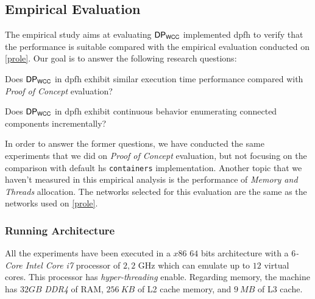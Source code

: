 \subsection{Empirical Evaluation}\label{sec:new:eval}
The empirical study aims at evaluating $\mathsf{DP_{WCC}}$ implemented \acrshort{dpfh} to verify that the performance is suitable compared with the empirical evaluation conducted on \autoref{prole}. 
Our goal is to answer the following research questions: 

\begin{inparaenum}[\bf {\bf RQ}1\upshape)]
\label{res:question}
    \item Does $\mathsf{DP_{WCC}}$ in \acrshort{dpfh} exhibit similar execution time performance compared with \textit{Proof of Concept} evaluation?
    \item Does $\mathsf{DP_{WCC}}$ in \acrshort{dpfh} exhibit continuous behavior enumerating connected components incrementally?
\end{inparaenum}

In order to answer the former questions, we have conducted the same experiments that we did on \textit{Proof of Concept} evaluation, but not focusing on the comparison with default \acrshort{hs} \texttt{containers} implementation. 
Another topic that we haven't measured in this empirical analysis is the performance of \textit{Memory and Threads} allocation. 
The networks selected for this evaluation are the same as the networks used on \autoref{prole}.

\subsubsection{Running Architecture}
All the experiments have been executed in a $x86$ $64$ bits architecture with a \textit{$6$-Core Intel Core i7} processor of $2,2$ GHz which can emulate up to $12$ virtual cores. This processor has \emph{hyper-threading} enable. Regarding memory, the machine has $32 GB$ \emph{DDR4} of RAM, $256\ KB$ of L2 cache memory, and $9\ MB$ of L3 cache.

